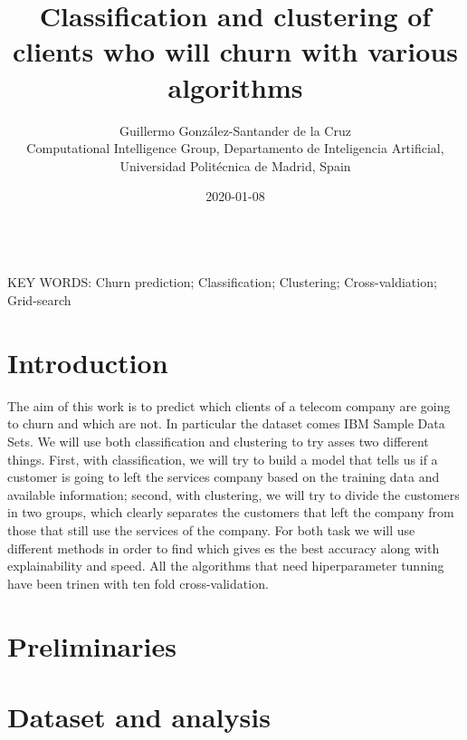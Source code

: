 \documentclass[a4paper,11pt]{article}
\begin{document}
\title{Classification and clustering of clients who will churn with various algorithms}

\author{{Guillermo González-Santander de la Cruz}\\
{\small Computational Intelligence Group, Departamento de Inteligencia Artificial, Universidad Politécnica de Madrid, Spain}}

\date{2020-01-08}
\maketitle



\begin{abstract}
\end{abstract}


\ \\
KEY WORDS: Churn prediction; Classification; Clustering; Cross-valdiation; Grid-search

\section{Introduction}

The aim of this work is to predict which clients of a telecom company are going to churn and which are not. In particular the dataset comes IBM Sample Data Sets.
We will use both classification and clustering to try asses two different things. First, with classification, we will try to build a model that tells us if a customer is going to left the services company based on the training data and available information; second, with clustering, we will try to divide the customers in two groups, which clearly separates the customers that left the company from those that still use the services of the company.
For both task we will use different methods in order to find which gives es the best accuracy along with explainability and speed.
All the algorithms that need hiperparameter tunning have been trinen with ten fold cross-validation.

\section{Preliminaries}

\section{Dataset and analysis}
\end{document}
